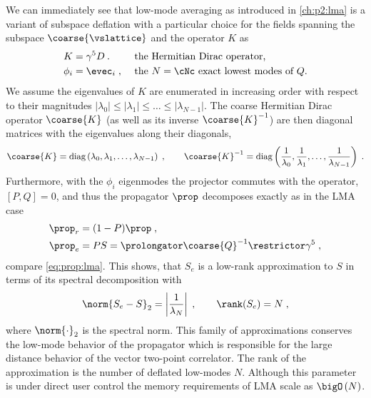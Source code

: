We can immediately see that low-mode averaging as introduced in \cref{ch:p2:lma} is a variant of subspace deflation with a particular choice for the fields spanning the subspace $\coarse{\vslattice}$ and the operator $K$ as
\begin{align}
K &= \gamma^{5} D \:.  &  &\text{ the Hermitian Dirac operator,} \\
\phi_i &= \evec_i \;,  &  &\text{ the $N=\cNc$ exact lowest modes of $Q$.}
\end{align}
We assume the eigenvalues of $K$ are enumerated in increasing order with respect to their magnitudes $\lvert \lambda_0 \rvert \leq \lvert \lambda_1 \rvert \leq \ldots \leq \lvert \lambda_{N-1} \rvert$.
The coarse Hermitian Dirac operator $\coarse{K}$ (as well as its inverse $\coarse{K}^{-1}$) are then diagonal matrices with the eigenvalues along their diagonals,
\begin{equation} \label{eq:sd:lma:diagonal:dirac}
\coarse{K} = \text{diag}\left(\lambda_0, \lambda_1, \ldots, \lambda_{N-1}\right) \;,
\qquad
\coarse{K}^{-1} = \text{diag}\left(\frac{1}{\lambda_0}, \frac{1}{\lambda_1}, \ldots, \frac{1}{\lambda_{N-1}}\right) \;.
\end{equation}
Furthermore, with the $\phi_i$ eigenmodes the projector commutes with the operator, $[P,Q]=0$, and thus the propagator $\prop$ decomposes exactly as in the LMA case
\begin{align}
\prop_{r} &= (1-P) \prop \;, \\
\prop_{e} &= PS = \prolongator \coarse{Q}^{-1} \restrictor \gamma^5 \;,
\end{align}
compare \cref{eq:prop:lma}.
This shows, that $S_e$ is a low-rank approximation to $S$ in terms of its spectral decomposition with
\begin{equation}
\norm{S_e - S}_2
 = \left\lvert \frac{1}{\lambda_{N}} \right\rvert \;,
\qquad
\rank(S_e) = N \;,
\end{equation}
where $\norm{\cdot}_2$ is the spectral norm.
This family of approximations conserves the low-mode behavior of the propagator which is responsible for the large distance behavior of the vector two-point correlator.
The rank of the approximation is the number of deflated low-modes $N$.
Although this parameter is under direct user control the memory requirements of LMA scale as $\bigO\left( N \right)$.

